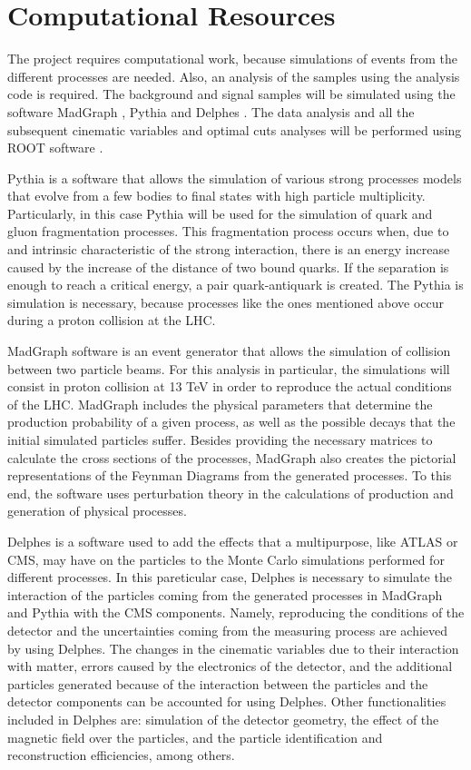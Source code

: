 \chapter{Computational Resources}

The project requires computational work, because simulations of events from the different processes are needed. Also, an analysis of the samples using the analysis code is required. The background and signal samples will be simulated using the software MadGraph \cite{MadGraph}, Pythia \cite{Pythia} and Delphes \cite{Delphes}. The data analysis and all the subsequent cinematic variables and optimal cuts analyses will be performed using ROOT software \cite{ROOT}.

Pythia is a software that allows the simulation of various strong processes models that evolve from a few bodies to final states with high particle multiplicity. Particularly, in this case Pythia will be used for the simulation of quark and gluon fragmentation processes. This fragmentation process occurs when, due to and intrinsic characteristic of the strong interaction, there is an energy increase caused by the increase of the distance of two bound quarks. If the separation is enough to reach a critical energy, a pair quark-antiquark is created. The Pythia is simulation is necessary, because processes like the ones mentioned above occur during a proton collision at the LHC.

MadGraph software is an event generator that allows the simulation of collision between two particle beams. For this analysis in particular, the simulations will consist in proton collision at 13 TeV in order to reproduce the actual conditions of the LHC. MadGraph includes the physical parameters that determine the production probability of a given process, as well as the possible decays that the initial simulated particles suffer. Besides providing the necessary matrices to calculate the cross sections of the processes, MadGraph also creates the pictorial representations of the Feynman Diagrams from the generated processes. To this end, the software uses perturbation theory in the calculations of production and generation of physical processes.

Delphes is a software used to add the effects that a multipurpose, like ATLAS or CMS, may have on the particles to the Monte Carlo simulations performed for different processes. In this pareticular case, Delphes is necessary to simulate the interaction of the particles coming from the generated processes in MadGraph and Pythia with the CMS components. Namely, reproducing the conditions of the detector and the uncertainties coming from the measuring process are achieved by using Delphes. The changes in the cinematic variables due to their interaction with matter, errors caused by the electronics of the detector, and the additional particles generated because of the interaction between the particles and the detector components can be accounted for using Delphes. Other functionalities included in Delphes are: simulation of the detector geometry, the effect of the magnetic field over the particles, and the particle identification and reconstruction efficiencies, among others.

